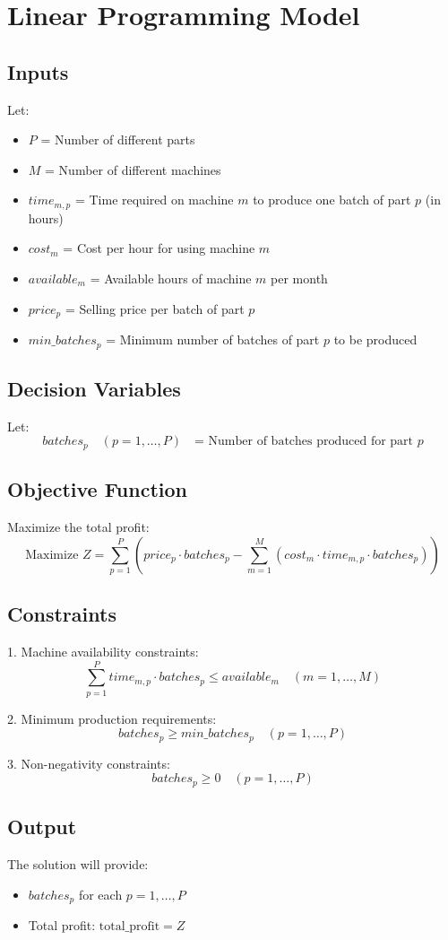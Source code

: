 \documentclass{article}
\begin{document}
\section*{Linear Programming Model}

\subsection*{Inputs}
Let:
\begin{itemize}
    \item \(P\) = Number of different parts
    \item \(M\) = Number of different machines
    \item \(time_{m,p}\) = Time required on machine \(m\) to produce one batch of part \(p\) (in hours)
    \item \(cost_m\) = Cost per hour for using machine \(m\)
    \item \(available_m\) = Available hours of machine \(m\) per month
    \item \(price_p\) = Selling price per batch of part \(p\)
    \item \(min\_batches_p\) = Minimum number of batches of part \(p\) to be produced
\end{itemize}

\subsection*{Decision Variables}
Let:
\[
batches_p \quad (p = 1, \ldots, P) \quad \text{= Number of batches produced for part } p
\]

\subsection*{Objective Function}
Maximize the total profit:
\[
\text{Maximize } Z = \sum_{p=1}^{P} \left( price_p \cdot batches_p - \sum_{m=1}^{M} (cost_m \cdot time_{m,p} \cdot batches_p) \right)
\]

\subsection*{Constraints}
1. Machine availability constraints:
\[
\sum_{p=1}^{P} time_{m,p} \cdot batches_p \leq available_m \quad (m = 1, \ldots, M)
\]

2. Minimum production requirements:
\[
batches_p \geq min\_batches_p \quad (p = 1, \ldots, P)
\]

3. Non-negativity constraints:
\[
batches_p \geq 0 \quad (p = 1, \ldots, P)
\]

\subsection*{Output}
The solution will provide:
\begin{itemize}
    \item \(batches_p\) for each \(p = 1, \ldots, P\)
    \item Total profit: \(\text{total\_profit} = Z\)
\end{itemize}
\end{document}
